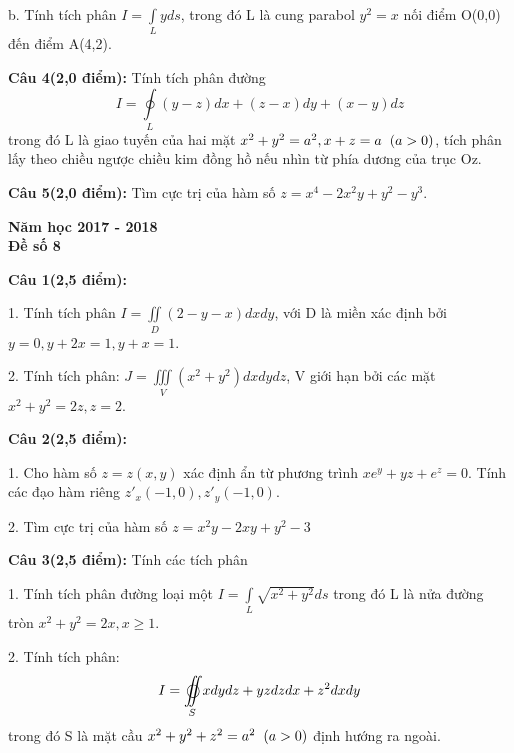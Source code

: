 \documentclass[14pt, a4paper]{article}
\begin{document}
	b. Tính tích phân $ I = \int\limits_L {yds} $, trong đó L là cung parabol $ {y^2}=x $ nối điểm O(0,0) đến điểm A(4,2).
	
	\vspace{0.5cm}
	
	\textbf{Câu 4(2,0 điểm):} Tính tích phân đường \[I = \oint\limits_L {(y - z)dx + (z - x)dy + (x - y)dz} \] trong đó L là giao tuyến của hai mặt $ {x^2} + {y^2} = {a^2},x + z = a \hspace{0.2 cm} (a > 0) $, tích phân lấy theo chiều ngược chiều kim đồng hồ nếu nhìn từ phía dương của trục Oz.
	\vspace{0.5cm}
	
	\textbf{Câu 5(2,0 điểm):} Tìm cực trị của hàm số $ z = {x^4} - 2{x^2}y + {y^2} - {y^3} $.
	
	\pagebreak
	
	\begin{center}
		{\LARGE \textbf{Năm học 2017 - 2018}}\\
		\vspace{0.5cm}
		{\large \textbf{Đề số 8}}
	\end{center}
	
	\textbf{Câu 1(2,5 điểm):}
	
	1. Tính tích phân $ I = \iint\limits_D {(2 - y - x)dxdy} $, với D là miền xác định bởi $ y=0, y+2x=1, y+x=1 $.
	
	2. Tính tích phân: $ J = \iiint\limits_V {({x^2} + {y^2})dxdydz} $, V giới hạn bởi các mặt $ {x^2} + {y^2} = 2z,z = 2 $.
	
	\vspace{0.5cm}
	
	\textbf{Câu 2(2,5 điểm):}
	
	1. Cho hàm số $ z=z(x, y) $ xác định ẩn từ phương trình $ x{e^y} + yz + {e^z} = 0 $. Tính các đạo hàm riêng $ {z'_x}( - 1,0),{z'_y}( - 1,0) $.
	
	2. Tìm cực trị của hàm số $ z = {x^2}y - 2xy + {y^2} - 3 $
	
	\vspace{0.5cm}
	
	\textbf{Câu 3(2,5 điểm):} Tính các tích phân
	
	1. Tính tích phân đường loại một $ I = \int\limits_L {\sqrt {{x^2} + {y^2}} ds} $  trong đó L là nửa đường tròn $ {x^2} + {y^2} = 2x, x \geqslant 1 $.
	
	2. Tính tích phân: \[ I = \mathop{{\int\!\!\!\!\!\int}\mkern-21mu \bigcirc}\limits_S 
	{xdydz + yzdzdx + {z^2}dxdy} \] trong đó S là mặt cầu $ {x^2} + {y^2} + {z^2} = {a^2} \hspace{0.2cm} (a > 0) $ định hướng ra ngoài.
	
\end{document}

